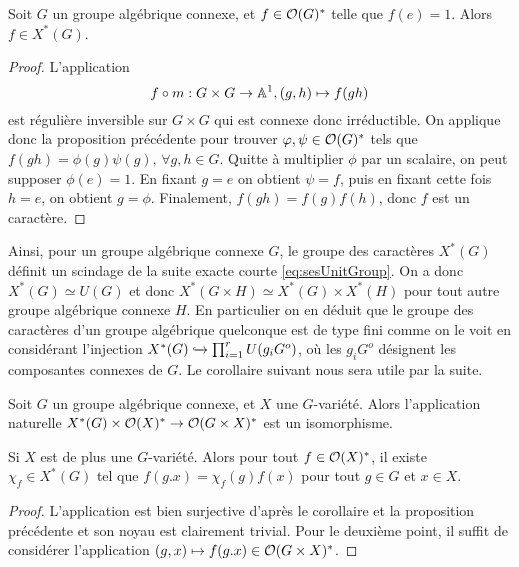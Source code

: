 \begin{prop}
Soit $G$ un groupe algébrique connexe, et $f\in \mathcal{O}(G)^*$ telle que $f(e)=1$. Alors $f\in X^*(G)$.
\end{prop}
\begin{proof}
L'application
$$f\circ m:G\times G\rightarrow \mathbb{A}^1, (g,h)\mapsto f(gh)$$
est régulière inversible sur $G\times G$ qui est connexe donc irréductible. On applique donc la proposition précédente pour trouver $\varphi,\psi \in \mathcal{O}(G)^*$ tels que $f(gh)=\phi(g)\psi(g),\,\forall g,h\in G$. Quitte à multiplier $\phi$ par un scalaire, on peut supposer $\phi(e)=1$. En fixant $g=e$ on obtient $\psi=f$, puis en fixant cette fois $h=e$, on obtient $g=\phi$. Finalement, $f(gh)=f(g)f(h)$, donc $f$ est un caractère.
\end{proof}

Ainsi, pour un groupe algébrique connexe $G$, le groupe des caractères $X^*(G)$ définit un scindage de la suite exacte courte \ref{eq:sesUnitGroup}. On a donc $X^*(G)\simeq U(G)$ et donc $X^*(G\times H)\simeq X^*(G)\times X^*(H)$ pour tout autre groupe algébrique connexe $H$. En particulier on en déduit que le groupe des caractères d'un groupe algébrique quelconque est de type fini comme on le voit en considérant l'injection $X^*(G)\xhookrightarrow{} \prod_{i=1}^rU(g_iG^o)$, où les $g_iG^o$ désignent les composantes connexes de $G$. Le corollaire suivant nous sera utile par la suite.

\begin{cor}\label{rosenlicht1}
Soit $G$ un groupe algébrique connexe, et $X$ une $G$-variété. Alors l'application naturelle $X^*(G)\times \mathcal{O}(X)^*\rightarrow \mathcal{O}(G\times X)^*$ est un isomorphisme.

Si $X$ est de plus une $G$-variété. Alors pour tout $f\in \mathcal{O}(X)^*$, il existe $\chi_f\in X^*(G)$ tel que $f(g.x)=\chi_f(g)f(x)$ pour tout $g\in G$ et $x\in X$.
\end{cor}
\begin{proof}
L'application est bien surjective d'après le corollaire et la proposition précédente et son noyau est clairement trivial. Pour le deuxième point, il suffit de considérer l'application $(g,x)\mapsto f(g.x)\in \mathcal{O}(G\times X)^*$.
\end{proof}
